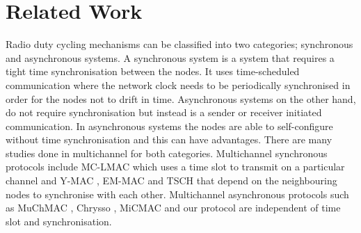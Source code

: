 \section{Related Work}
\label{sec:relatedwork}

Radio duty cycling mechanisms can be classified into two categories; synchronous and asynchronous systems. A synchronous system is a system that requires a tight time synchronisation between the nodes. It uses time-scheduled communication where the network clock needs to be periodically synchronised in order for the nodes not to drift in time. Asynchronous systems on the other hand, do not require synchronisation but instead is a sender or receiver initiated communication. In asynchronous systems the nodes are able to self-configure without time synchronisation and this can have advantages. There are many studies done in multichannel for both categories. Multichannel synchronous protocols include MC-LMAC \cite{mc-lmac} which uses a time slot to transmit on a particular channel and Y-MAC \cite{y-mac}, EM-MAC \cite{emmac} and TSCH that depend on the neighbouring nodes to synchronise with each other. Multichannel asynchronous protocols such as MuChMAC \cite{muchmac}, Chrysso \cite{chrysso}, MiCMAC \cite{micmac} and our protocol are independent of time slot and synchronisation. 


